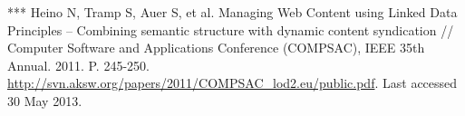 \documentclass[12pt]{llncs}
\begin{document}
\begin{thebibliography}{99}
 ***
  Heino N, Tramp S, Auer S, et al. Managing Web Content using Linked
  Data Principles -- Combining semantic structure with dynamic content
  syndication // Computer Software and Applications Conference
  (COMPSAC), IEEE 35th Annual. 2011. P. 245-250.
  \url{http://svn.aksw.org/papers/2011/COMPSAC\_lod2.eu/public.pdf}. Last accessed 30 May 2013.
\end{thebibliography}
\end{document}
